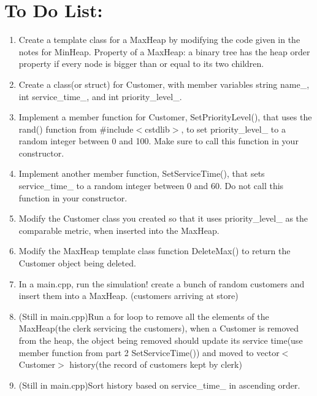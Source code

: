 \documentclass{article}
\begin{document}
\section{To Do List:}
\begin{enumerate}
    \item Create a template class for a MaxHeap by modifying the code given in the notes for MinHeap.
    Property of a MaxHeap: a binary tree has the heap order property if every node is bigger than or equal 
    to its two children.
    \item Create a class(or struct) for Customer, with member variables string name\_, int service\_time\_,
    and int priority\_level\_.
    \item Implement a member function for Customer, SetPriorityLevel(), that uses the rand() function from \#include$<$cstdlib$>$,
    to set priority\_level\_ to a random integer between 0 and 100. Make sure to call this function in your constructor.
    \item Implement another member function, SetServiceTime(), that sets service\_time\_ to a random integer between 0 and 60. 
    Do not call this function in your constructor.
    \item Modify the Customer class you created so that it uses priority\_level\_ as the comparable metric, 
    when inserted into the MaxHeap.
    \item Modify the MaxHeap template class function DeleteMax() to return the Customer object being deleted.
    \item In a main.cpp, run the simulation! create a bunch of random customers and insert them into a 
    MaxHeap. (customers arriving at store)
    \item (Still in main.cpp)Run a for loop to remove all the elements of the MaxHeap(the clerk servicing the customers),
    when a Customer is removed from the heap, the object being removed should update its service time(use member function
    from part 2 SetServiceTime()) and moved to vector$<$Customer$>$ history(the record of customers kept by clerk)
    \item (Still in main.cpp)Sort history based on service\_time\_ in ascending order. 
\end{enumerate}
\end{document}

